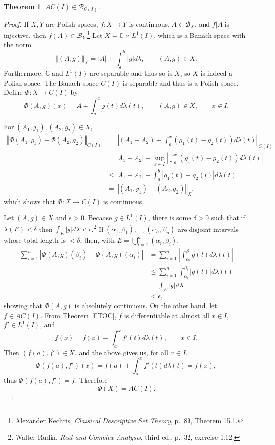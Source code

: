 \documentclass{article}
\newcommand{\norm}[1]{\left\Vert #1 \right\Vert}
\newtheorem{theorem}{Theorem}
\theoremstyle{definition}
\begin{document}
\begin{theorem}
$AC(I) \in \mathscr{B}_{C(I)}$.
\end{theorem}
\begin{proof}
If $X,Y$ are Polish spaces, $f:X \to Y$ is continuous, $A \in \mathscr{B}_X$, and $f|A$ is injective, then
$f(A) \in \mathscr{B}_Y$.\footnote{Alexander Kechris, {\em Classical Descriptive Set Theory}, p.~89, Theorem 15.1.}
Let $X=\mathbb{C} \times L^1(I)$,
which is a Banach space with the norm
\[
\norm{(A,g)}_X = |A|+\int_a^b |g| d\lambda, \qquad (A,g) \in X.
\]
Furthermore, $\mathbb{C}$ and $L^1(I)$ are separable and thus so is $X$, so $X$ is indeed a Polish space. The Banach space $C(I)$ is separable and thus is a Polish
space. 
Define $\Phi:X \to C(I)$ by
\[
\Phi(A,g)(x) = A + \int_a^x g(t) d\lambda(t), \qquad (A,g) \in X,  \qquad x \in I.
\]

For $(A_1,g_1),(A_2,g_2) \in X$,
\begin{align*}
\norm{\Phi(A_1,g_1)-\Phi(A_2,g_2)}_{C(I)} &= \norm{(A_1-A_2)+\int_a^x (g_1(t)-g_2(t)) d\lambda(t)}_{C(I)}\\
&=|A_1-A_2|+\sup_{x \in I} \left| \int_a^x (g_1(t)-g_2(t)) d\lambda(t)\right| \\
&\leq |A_1-A_2|+\int_a^b |g_1(t)-g_2(t)| d\lambda(t)\\
&=\norm{(A_1,g_1)-(A_2,g_2)}_X,
\end{align*}
which shows that $\Phi:X \to C(I)$ is continuous.

Let $(A,g) \in X$ and $\epsilon>0$. Because $g \in L^1(I)$, there is some
$\delta>0$ such that
if $\lambda(E)<\delta$ then $\int_E |g| d\lambda<\epsilon$.\footnote{Walter Rudin, {\em Real and Complex Analysis},
third ed., p.~32, exercise 1.12.}
If $(\alpha_1,\beta_1),\ldots,(\alpha_n,\beta_n)$ are disjoint intervals whose total length is $<\delta$,
then, with $E=\bigcup_{i=1}^n (\alpha_i,\beta_i)$,
\begin{align*}
\sum_{i=1}^n |\Phi(A,g)(\beta_i)-\Phi(A,g)(\alpha_i)| &= 
\sum_{i=1}^n \left| \int_{\alpha_i}^{\beta_i} g(t) d\lambda(t) \right|\\
&\leq \sum_{i=1}^n \int_{\alpha_i}^{\beta_i} |g(t)| d\lambda(t)\\
&=\int_E |g| d\lambda\\
&<\epsilon,
\end{align*}
showing that $\Phi(A,g)$ is absolutely continuous. 
On the other hand, let $f \in AC(I)$. From Theorem \ref{FTOC}, $f$ is differentiable at almost all $x \in I$,
$f' \in L^1(I)$, and  
\[
f(x)-f(a) = \int_a^x f'(t) d\lambda(t), \qquad x \in I.
\]
Then $(f(a),f') \in X$, and the above gives us, for all $x \in I$,
\[
\Phi(f(a),f')(x) =  f(a)+\int_a^x f'(t) d\lambda(t) = f(x),
\]
thus $\Phi(f(a),f')=f$. 
Therefore
\[
\Phi(X) = AC(I).
\]


\end{proof}
\end{document}
